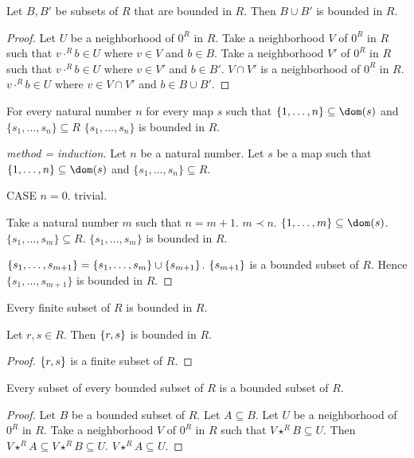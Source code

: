 \documentclass[11pt]{article}
\newcommand{\Seq}[2]{\{#1,\dots,#2\}}
\newcommand{\FinSet}[3]{\{#1_{#2},\dots,#1_{#3}\}}
\begin{document}
\begin{forthel}
\begin{lemma}
Let $B,B'$ be subsets of $R$ that are bounded in $R$.
Then $B \cup B'$ is bounded in $R$.
\end{lemma}
\begin{proof}
Let $U$ be a neighborhood of $0^{R}$ in $R$.
Take a neighborhood $V$ of $0^{R}$ in $R$ such that
$v \cdot^{R} b \in U$ where $v \in V$ and $b \in B$.
Take a neighborhood $V'$ of $0^{R}$ in $R$ such that
$v \cdot^{R} b \in U$ where $v \in V'$ and $b \in B'$.
$V \cap V'$ is a neighborhood of $0^{R}$ in $R$.
$v \cdot^{R} b \in U$ where $v \in V \cap V'$ and 
$b \in B \cup B'$.
\end{proof}

\begin{lemma} For every natural number $n$
for every map $s$ such that 
$\Seq{1}{n} \subseteq \dom(s)$ and $\FinSet{s}{1}{n} \subseteq R$
$\FinSet{s}{1}{n}$ is bounded in $R$.
\end{lemma}
\begin{proof}[method = induction]
Let $n$ be a natural number.
Let $s$ be a map such that 
$\Seq{1}{n} \subseteq \dom(s)$ and $\FinSet{s}{1}{n} \subseteq R$.

CASE $n = 0$. trivial.

Take a natural number $m$ such that $n = m +1$. $m \prec n$.
$\Seq{1}{m} \subseteq \dom(s)$. $\FinSet{s}{1}{m} \subseteq R$.
$\FinSet{s}{1}{m}$ is bounded in $R$.

$\FinSet{s}{1}{m+1} = \FinSet{s}{1}{m} \cup \sing{s_{m+1}}$.
$\{s_{m+1}\}$ is a bounded subset of $R$.
Hence $\FinSet{s}{1}{m+1}$ is bounded in $R$.
\end{proof}

\begin{lemma}[title = 5 28 1]
Every finite subset of $R$ is bounded in $R$.
\end{lemma}

\begin{lemma}
Let $r,s \in R$. Then $\{r,s\}$ is bounded in $R$.
\end{lemma}
\begin{proof}
$\{r,s\}$ is a finite subset of $R$.
\end{proof}

\begin{lemma}[title = L 136]
Every subset of every bounded subset of $R$ is a bounded subset of $R$.
\end{lemma}
\begin{proof}
Let $B$ be a bounded subset of $R$.
Let $A \subseteq B$.
Let $U$ be a neighborhood of $0^{R}$ in $R$.
Take a neighborhood $V$ of $0^{R}$ in $R$ such that $V \star^{R} B \subseteq U$.
Then $V \star^{R} A \subseteq V \star^{R} B \subseteq U$.
$V \star^{R} A \subseteq U$.
\end{proof}
\end{forthel}
\end{document}
